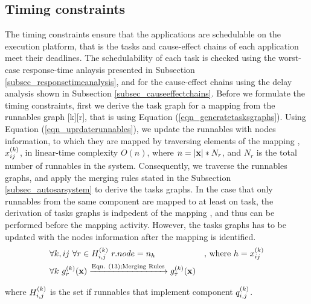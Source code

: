 \subsection{Timing constraints}
The timing constraints ensure that the applications are schedulable on the execution platform, that is the tasks and cause-effect chains of each application meet their deadlines. The schedulability of each task is checked using the worst-case response-time anlaysis presented in Subsection \ref{subsec_responsetimeanalysis}, and for the cause-effect chains using the delay analysis shown in Subsection \ref{subsec_causeeffectchains}. Before we formulate the timing constraints, first we derive the task graph for a mapping \ttx from the runnables graph [k][r], that is using Equation (\ref{eqn_generatetasksgraphs}).  Using Equation (\ref{eqn_uprdaterunnables}), we update the runnables with nodes information, to which they are mapped by traversing elements of the mapping \ttx, $x^{(k)}_{ij}$, in linear-time complexity $O(n)$, where $n=|\textbf{x}|*N_r$, and $N_r$ is the total number of runnables in the system. Consequently, we traverse the runnables graphs, and apply the merging rules stated in the Subsection \ref{subsec_autosarsystem} to derive the tasks graphs. In the case that only runnables from the same component are mapped to at least on task, the derivation of tasks graphs is indpedent of the mapping \ttx, and thus can be performed before the mapping activity. However, the tasks graphs has to be updated with the nodes information after the mapping \ttx is identified.
\begin{align}
\label{eqn_uprdaterunnables}
&\forall k,ij\ \forall r\in \sss{H}[k][i,j]\ r.node = n_h& \mbox{, where } h=\xkij\\
\label{eqn_generatetasksgraphs}
&\forall k\ \sss{g}[k][r](\x)\xrightarrow{\text{Eqn. (13);Merging Rules}}\sss{g}[k][\tau](\x)
\end{align}

where $\sss{H}[k][i,j]$ is the set if runnables that implement component $\sss{q}[k][i,j]$.


